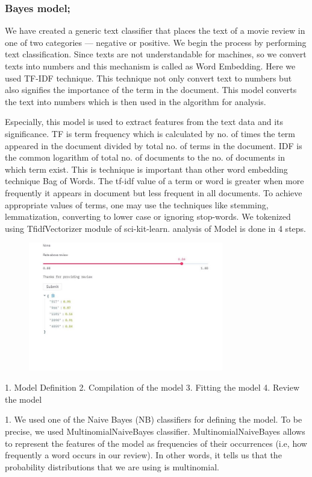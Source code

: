 \documentclass[sigplan,screen]{acmart}
\begin{document}
\subsubsection{Bayes model;}
We have created a generic text classifier that places the text of a movie review in one of two categories — negative or positive. We begin the process by performing text classification. Since texts are not understandable for machines, so we convert texts into numbers and this mechanism is called as Word Embedding. Here we used TF-IDF technique. This technique not only convert text to numbers but also signifies the importance of the term in the document. This model converts the text into numbers which is then used in the algorithm for analysis. 

Especially, this model is used to extract features from the text data and its significance. TF is term frequency which is calculated by no. of times the term appeared in the document divided by total no. of terms in the document. IDF is the common logarithm of total no. of documents to the no. of documents in which term exist. This is technique is important than other word embedding technique Bag of Words. The tf-idf value of a term or word is greater when more frequently it appears in document but less frequent in all documents. To achieve appropriate values of terms, one may use the techniques like stemming, lemmatization, converting to lower case or ignoring stop-words. We tokenized using TfidfVectorizer module of sci-kit-learn. analysis of Model is done in 4 steps.

\begin{figure}[h]
    \includegraphics[width=8.5cm]{HMI_SC_3.jpeg}
    \caption{}
    \label{fig:ss 3}
\end{figure}

1. Model Definition 2. Compilation of the model 3. Fitting the model 4. Review the model

1. We used one of the Naive Bayes (NB) classifiers for defining the model. To be precise, we used MultinomialNaiveBayes classifier. MultinomialNaiveBayes allows to represent the features of the model as frequencies of their occurrences (i.e, how frequently a word occurs in our review). In other words, it tells us that the probability distributions that we are using is multinomial. 
\end{document}
